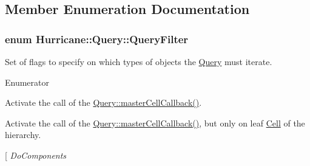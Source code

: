 \subsection{Member Enumeration Documentation}
\hypertarget{classHurricane_1_1Query_a003517b82eaba58104d1749cf344eaa9}{
\subsubsection[{Query\-Filter}]{\setlength{\rightskip}{0pt plus 5cm}enum {\bf Hurricane\-::\-Query\-::\-Query\-Filter}}}\label{classHurricane_1_1Query_a003517b82eaba58104d1749cf344eaa9}
Set of flags to specify on which types of objects the \hyperlink{classHurricane_1_1Query}{Query} must iterate. \begin{Desc}
\item[Enumerator]\par
\begin{description}
\item[{\em 
\hypertarget{classHurricane_1_1Query_a003517b82eaba58104d1749cf344eaa9a427b951cfef3fbeb3c2baa9abc4eae83}{Do\-Master\-Cells}\label{classHurricane_1_1Query_a003517b82eaba58104d1749cf344eaa9a427b951cfef3fbeb3c2baa9abc4eae83}
}]Activate the call of the \hyperlink{classHurricane_1_1Query_abaf97e93c7fa96469adf64f7865938b4}{Query\-::master\-Cell\-Callback()}. \item[{\em 
\hypertarget{classHurricane_1_1Query_a003517b82eaba58104d1749cf344eaa9a2a1f9d4cf126b86694e05152a1b04ee9}{Do\-Terminal\-Cells}\label{classHurricane_1_1Query_a003517b82eaba58104d1749cf344eaa9a2a1f9d4cf126b86694e05152a1b04ee9}
}]Activate the call of the \hyperlink{classHurricane_1_1Query_abaf97e93c7fa96469adf64f7865938b4}{Query\-::master\-Cell\-Callback()}, but only on leaf \hyperlink{classHurricane_1_1Cell}{Cell} of the hierarchy. \item[{\em 
\hypertarget{classHurricane_1_1Query_a003517b82eaba58104d1749cf344eaa9a7b591d72b86f94f90d212746ed8f9f56}{Do\-Components}\label{classHurricane_1_1Query_a003517b82eaba58104d1749cf344eaa9a7b591d72b86f94f90d212746ed8f9f56}
}
\end{description}
\end{Desc}
